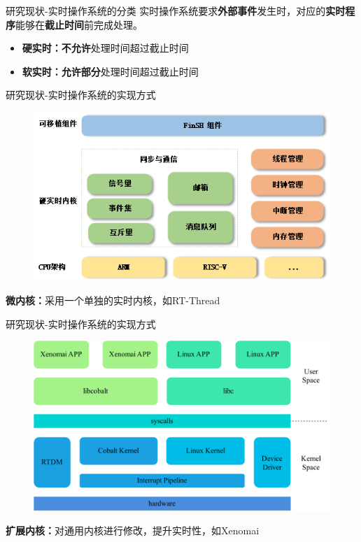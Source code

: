 \documentclass{beamer}
\begin{document}
\begin{frame}{研究现状-实时操作系统的分类}
    实时操作系统要求\textbf{外部事件}发生时，对应的\textbf{实时程序}能够在\textbf{截止时间}前完成处理。
    \begin{itemize}
        \item \textbf{硬实时：}\textbf{不允许}处理时间超过截止时间
        \item \textbf{软实时：}\textbf{允许部分}处理时间超过截止时间
    \end{itemize}
\end{frame}

\begin{frame}{研究现状-实时操作系统的实现方式}
    
        \begin{figure}[h]
            \centering
            \includegraphics[height=.5\textheight]{img/rtthread.png}
        \end{figure}
    \begin{center}
        \textbf{微内核：}采用一个单独的实时内核，如RT-Thread
    \end{center}
\end{frame}

\begin{frame}{研究现状-实时操作系统的实现方式}
    
    \begin{figure}[h]
        \centering
        \includegraphics[height=.5\textheight]{img/Img/xenomai-prj.pdf}
    \end{figure}
    \begin{center}
        \textbf{扩展内核：}对通用内核进行修改，提升实时性，如Xenomai
    \end{center}
\end{frame}
\end{document}
